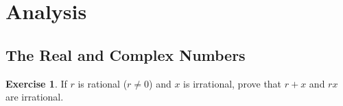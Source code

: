 \documentclass{article}
\theoremstyle{definition}
\newtheorem{exercise}[theorem]{Exercise}
\begin{document}
\section*{Analysis}
\subsection*{The Real and Complex Numbers}

\begin{exercise}
    If \(r\) is rational (\(r\neq0\)) and \(x\) is irrational, prove that \(r+x\) and \(rx\) are irrational.
\end{exercise}
\end{document}
